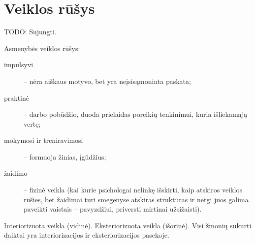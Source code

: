 \section{Veiklos rūšys}

\label{tema:veiklos_rusys}

TODO: Sujungti.

Asmenybės veiklos rūšys:

\begin{description}
  \item[impulsyvi] – nėra aiškaus motyvo, bet yra neįsisąmoninta paskata;
  \item[praktinė] – darbo pobūdžio, duoda prielaidas poreikių tenkinimui,
    kuria išliekamąją vertę; %
  \item[mokymosi ir treniravimosi] – formuoja žinias, įgūdžius;
  \item[žaidimo] – fizinė veikla (kai kurie psichologai nelinkę išskirti,
    kaip atskiros veiklos rūšies, bet žaidimai turi smegenyse atskiras 
    struktūras ir netgi juos galima paveikti vaistais – pavyzdžiui, 
    priversti mirtinai užsižaisti).
\end{description}

Interiorizuota veikla (vidinė).
Eksteriorizuota veikla (išorinė).
Visi žmonių sukurti daiktai yra interiorizacijos ir eksteriorizacijos
pasekoje.

